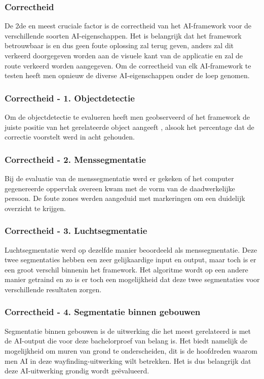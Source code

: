 \subsubsection{Correctheid}
De 2de en meest cruciale factor is de correctheid van het AI-framework voor de verschillende soorten AI-eigenschappen. Het is belangrijk dat het framework betrouwbaar is en dus geen foute oplossing zal terug geven, anders zal dit verkeerd doorgegeven worden aan de visuele kant van de applicatie en zal de route verkeerd worden aangegeven. Om de correctheid van elk AI-framework te testen heeft men opnieuw de diverse AI-eigenschappen onder de loep genomen.

\subsubsection{Correctheid - 1.  Objectdetectie}
Om de objectdetectie te evalueren heeft men geobserveerd of het framework de juiste positie van het gerelateerde object aangeeft , alsook het percentage dat de correctie voorstelt werd in acht gehouden.

\subsubsection{Correctheid - 2. Menssegmentatie}
Bij de evaluatie van de menssegmentatie werd er gekeken of het computer gegenereerde oppervlak overeen kwam met de vorm van de daadwerkelijke persoon. De foute zones werden aangeduid met markeringen om een duidelijk overzicht te krijgen.

\subsubsection{Correctheid - 3. Luchtsegmentatie}
Luchtsegmentatie werd op dezelfde manier beoordeeld als menssegmentatie. Deze twee segmentaties hebben een zeer gelijkaardige input en output, maar toch is er een groot verschil binnenin het framework. Het algoritme wordt op een andere manier getraind en zo is er toch een mogelijkheid dat deze twee segmentaties voor verschillende resultaten zorgen.

\subsubsection{Correctheid - 4. Segmentatie binnen gebouwen}
Segmentatie binnen gebouwen is de uitwerking die het meest gerelateerd is met de AI-output die voor deze bachelorproef van belang is. Het biedt namelijk de mogelijkheid om muren van grond te onderscheiden, dit is de hoofdreden waarom men AI in deze wayfinding-uitwerking wilt betrekken. Het is dus belangrijk dat deze AI-uitwerking grondig wordt geëvalueerd.

